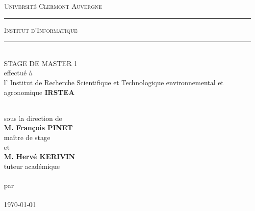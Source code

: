 \newcommand{\HRule}{\rule[2mm]{10mm}{0.5mm}}
\center
\textsc{\LARGE Université Clermont Auvergne}\\[0.3]
\HRule \textsc{ Institut d'Informatique} \HRule \\[1cm]

\makeatletter
{STAGE DE MASTER 1}\\[0.4cm]

effectué à 
\\[0.2mm]
l' Institut de Recherche Scientifique et Technologique environnemental et agronomique {\bf IRSTEA}

\\[0.5cm]
sous la direction de\\[0.5cm]
{\bf M. François PINET}\\
maître de stage
\\[0.5cm]
et
\\[0.5cm]
{\bf M. Hervé KERIVIN}\\
tuteur académique
\\[2cm]

{\bf \@title}\\[1cm]

par\\[1cm]

\@author \\[0.5]


\today
